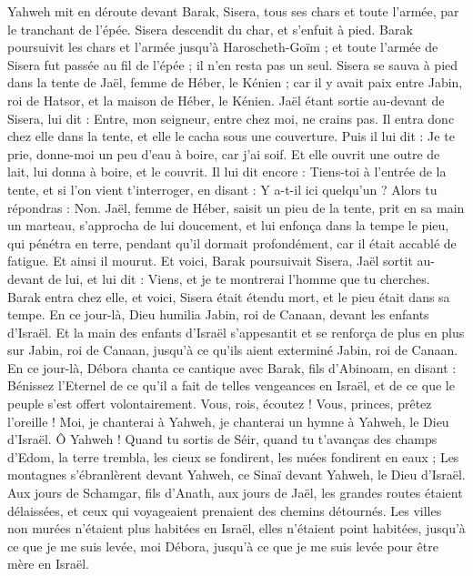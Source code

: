 \begin{multicols}{2}
Yahweh mit en déroute devant Barak, Sisera, tous ses chars et toute l'armée, par le tranchant de l'épée. Sisera descendit du char, et s'enfuit à pied.
Barak poursuivit les chars et l'armée jusqu'à Haroscheth-Goïm ; et toute l'armée de Sisera fut passée au fil de l'épée ; il n'en resta pas un seul.
Sisera se sauva à pied dans la tente de Jaël, femme de Héber, le Kénien ; car il y avait paix entre Jabin, roi de Hatsor, et la maison de Héber, le Kénien.
Jaël étant sortie au-devant de Sisera, lui dit : Entre, mon seigneur, entre chez moi, ne crains pas. Il entra donc chez elle dans la tente, et elle le cacha sous une couverture.
Puis il lui dit : Je te prie, donne-moi un peu d'eau à boire, car j'ai soif. Et elle ouvrit une outre de lait, lui donna à boire, et le couvrit.
Il lui dit encore : Tiens-toi à l'entrée de la tente, et si l’on vient t’interroger, en disant : Y a-t-il ici quelqu'un ? Alors tu répondras : Non.
Jaël, femme de Héber, saisit un pieu de la tente, prit en sa main un marteau, s’approcha de lui doucement, et lui enfonça dans la tempe le pieu, qui pénétra en terre, pendant qu'il dormait profondément, car il était accablé de fatigue. Et ainsi il mourut.
Et voici, Barak poursuivait Sisera, Jaël sortit au-devant de lui, et lui dit : Viens, et je te montrerai l'homme que tu cherches. Barak entra chez elle, et voici, Sisera était étendu mort, et le pieu était dans sa tempe.
En ce jour-là, Dieu humilia Jabin, roi de Canaan, devant les enfants d'Israël.
Et la main des enfants d'Israël s’appesantit et se renforça de plus en plus sur Jabin, roi de Canaan, jusqu'à ce qu'ils aient exterminé Jabin, roi de Canaan.
\VerseOne{}En ce jour-là, Débora chanta ce cantique avec Barak, fils d'Abinoam, en disant :
Bénissez l’Eternel de ce qu’il a fait de telles vengeances en Israël, et de ce que le peuple s’est offert volontairement.
Vous, rois, écoutez ! Vous, princes, prêtez l'oreille ! Moi, je chanterai à Yahweh, je chanterai un hymne à Yahweh, le Dieu d'Israël.
Ô Yahweh ! Quand tu sortis de Séir, quand tu t’avanças des champs d'Edom, la terre trembla, les cieux se fondirent, les nuées fondirent en eaux ;
Les montagnes s'ébranlèrent devant Yahweh, ce Sinaï devant Yahweh, le Dieu d'Israël.
Aux jours de Schamgar, fils d’Anath, aux jours de Jaël, les grandes routes étaient délaissées, et ceux qui voyageaient prenaient des chemins détournés.
Les villes non murées n’étaient plus habitées en Israël, elles n’étaient point habitées, jusqu’à ce que je me suis levée, moi Débora, jusqu’à ce que je me suis levée pour être mère en Israël.

\end{multicols}
